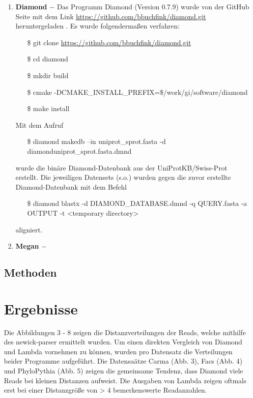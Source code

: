 \documentclass[10pt, a4paper]{article}[08.12.2015]
\begin{document}
\begin{enumerate}
          
          \item \textbf{Diamond} $-$ Das Programm Diamond (Version 0.7.9) wurde 
          von der GitHub Seite mit dem Link
          \url{https://github.com/bbuchfink/diamond.git} heruntergeladen
          \cite{buchfink2014}. Es wurde folgenderma\ss{en} verfahren:
          \begin{itemize}
            \item[\$] git clone \url{https://github.com/bbuchfink/diamond.git}
            \item[\$] cd diamond
            \item[\$] mkdir build
            \item[\$] cmake 																-DCMAKE\_INSTALL\_PREFIX=\$/work/gi/software/diamond
            \item[\$] make install
		  \end{itemize}
		  Mit dem Aufruf
		  \begin{itemize}
		    \item[\$] diamond makedb --in uniprot\_sprot.fasta -d 							diamonduniprot\_sprot.fasta.dmnd
		  \end{itemize}
		  wurde die bin\"are Diamond-Datenbank aus der UniProtKB/Swiss-Prot 			  erstellt.\newline
		  Die jeweiligen Datensets (s.o.) wurden gegen die zuvor erstellte 				  Diamond-Datenbank mit dem Befehl
		  \begin{itemize}
		    \item[\$] diamond blastx -d DIAMOND\_DATABASE.dmnd -q QUERY.fasta 				-a OUTPUT -t <temporary directory> 
		  \end{itemize}
		  aligniert.		             
          
          \item \textbf{Megan} $-$
          
        \end{enumerate}
    \subsection{Methoden}
    
  
    \newpage
  \section{Ergebnisse}
  Die Abbildungen 3 - 8 zeigen die Distanzverteilungen der Reads, welche mithilfe des newick-parser ermittelt wurden. Um einen direkten Vergleich von Diamond und Lambda vornehmen zu k\"onnen, wurden pro Datensatz die Verteilungen beider Programme aufgef\"uhrt. Die Datensa\"atze Carma (Abb. 3), Facs (Abb. 4) und PhyloPythia (Abb. 5) zeigen die gemeinsame Tendenz, dass Diamond viele Reads bei kleinen Distanzen aufweist. Die Ausgaben von Lambda zeigen oftmals erst bei einer Distanzgr\"o{\ss}e von > 4 bemerkenswerte Readanzahlen.
  
\end{document}
